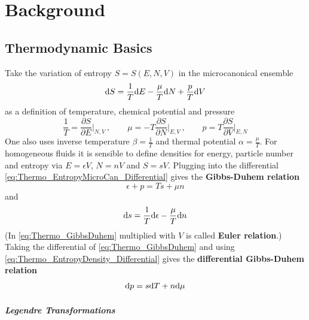 \chapter{Background}

\section{Thermodynamic Basics \cite{Floerchinger_2016}}

Take the variation of entropy $S=S(E,N,V)$ in the microcanonical ensemble
\begin{equation}
    \text{d} S=\frac{1}{T}\text{d} E-\frac{\mu}{T}\text{d} N+\frac{p}{T}\text{d} V
    \label{eq:Thermo_EntropyMicroCan_Differential}
\end{equation}
as a definition of temperature, chemical potential and pressure
\begin{equation}
    \frac{1}{T}=\frac{\partial S}{\partial E}\Big\vert_{N,V}\,,\qquad\mu=-T\frac{\partial S}{\partial N}\Big\vert_{E,V}\,,\qquad p=T\frac{\partial S}{\partial V}\Big\vert_{E,N}
\end{equation}
One also uses inverse temperature $\beta=\frac{1}{T}$ and thermal potential $\alpha=\frac{\mu}{T}$. For homogeneous fluids it is sensible to define densities for energy, particle number and entropy via $E=\epsilon V$, $N=nV$ and $S=sV$. Plugging into the differential \eqref{eq:Thermo_EntropyMicroCan_Differential} gives the \textbf{Gibbs-Duhem relation}
\begin{equation}
    \epsilon+p=Ts+\mu n
    \label{eq:Thermo_GibbsDuhem}
\end{equation}
and
\begin{equation}
    \text{d} s=\frac{1}{T}\text{d}\epsilon-\frac{\mu}{T}\text{d} n
    \label{eq:Thermo_EntropyDensity_Differential}
\end{equation}
(In \cite{Rischke_2022} \eqref{eq:Thermo_GibbsDuhem} multiplied with $V$ is called \textbf{Euler relation}.) Taking the differential of \eqref{eq:Thermo_GibbsDuhem} and using \eqref{eq:Thermo_EntropyDensity_Differential} gives the \textbf{differential Gibbs-Duhem relation}
\begin{equation}
    \text{d} p=s\text{d} T+n\text{d}\mu
    \label{eq:Thermo_DifferentialGibbsDuhem}
\end{equation}

\paragraph*{Legendre Transformations}\mbox{}\\

